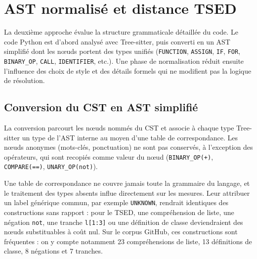 \documentclass[12pt,a4paper,oneside]{report}
\begin{document}
\section{AST normalisé et distance TSED}

La deuxième approche évalue la structure grammaticale détaillée du code. Le
code Python est d'abord analysé avec Tree-sitter, puis converti en un AST
simplifié dont les nœuds portent des types unifiés (\texttt{FUNCTION},
\texttt{ASSIGN}, \texttt{IF}, \texttt{FOR}, \texttt{BINARY\_OP}, \texttt{CALL},
\texttt{IDENTIFIER}, etc.). Une phase de normalisation réduit ensuite
l'influence des choix de style et des détails formels qui ne modifient pas la
logique de résolution.

\subsection{Conversion du CST en AST simplifié}
\label{sec:conversion_ast}

La conversion parcourt les nœuds nommés du CST et associe à chaque type
Tree-sitter un type de l'AST interne au moyen d'une table de correspondance.
Les nœuds anonymes (mots-clés, ponctuation) ne sont pas conservés, à
l'exception des opérateurs, qui sont recopiés comme valeur du nœud
(\texttt{BINARY\_OP(+)}, \texttt{COMPARE(==)}, \texttt{UNARY\_OP(not)}).

Une table de correspondance ne couvre jamais toute la grammaire du
langage, et le traitement des types absents influe directement sur les
mesures. Leur attribuer un label générique commun, par exemple
\texttt{UNKNOWN}, rendrait identiques des constructions sans rapport : pour
le TSED, une compréhension de liste, une négation \texttt{not}, une tranche
\texttt{l[1:3]} ou une définition de classe deviendraient des nœuds
substituables à coût nul. Sur le corpus GitHub, ces constructions sont
fréquentes : on y compte notamment 23 compréhensions de liste, 13
définitions de classe, 8 négations et 7 tranches.
\end{document}
